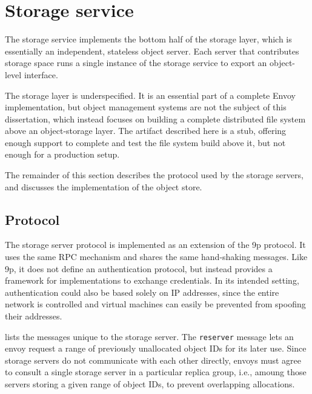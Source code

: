 \section{Storage service}

The storage service implements the bottom half of the storage layer, which is essentially an independent, stateless object server. Each server that contributes storage space runs a single instance of the storage service to export an object-level interface.

The storage layer is underspecified. It is an essential part of a complete Envoy implementation, but object management systems are not the subject of this dissertation, which instead focuses on building a complete distributed file system above an object-storage layer. The artifact described here is a stub, offering enough support to complete and test the file system build above it, but not enough for a production setup.

The remainder of this section describes the protocol used by the storage servers, and discusses the implementation of the object store.

\subsection{Protocol}

The storage server protocol is implemented as an extension of the 9p protocol. It uses the same RPC mechanism and shares the same hand-shaking messages. Like 9p, it does not define an authentication protocol, but instead provides a framework for implementations to exchange credentials. In its intended setting, authentication could also be based solely on IP addresses, since the entire network is controlled and virtual machines can easily be prevented from spoofing their addresses.

 lists the messages unique to the storage server. The \texttt{reserver} message lets an envoy request a range of previously unallocated object IDs for its later use. Since storage servers do not communicate with each other directly, envoys must agree to consult a single storage server in a particular replica group, i.e., amoung those servers storing a given range of object IDs, to prevent overlapping allocations.

